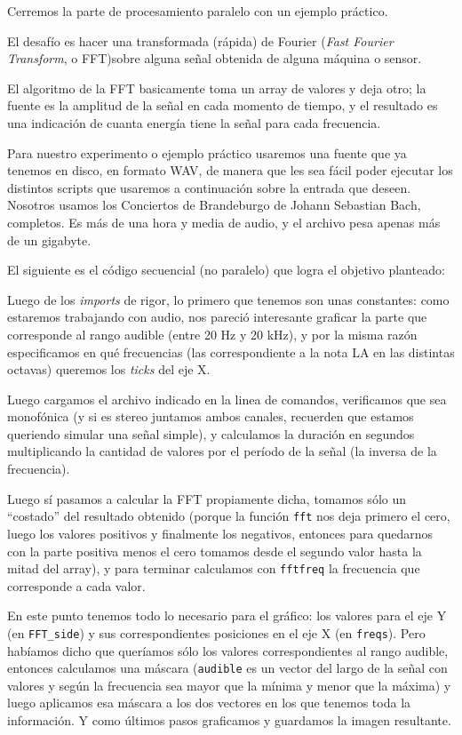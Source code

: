 Cerremos la parte de procesamiento paralelo con un ejemplo práctico.

El desafío es hacer una transformada (rápida) de Fourier (\textit{Fast Fourier Transform}, o FFT)sobre alguna señal obtenida de alguna máquina o sensor.

\begin{info}
El algoritmo de la FFT basicamente toma un array de valores y deja otro; la fuente es la amplitud de la señal en cada momento de tiempo, y el resultado es una indicación de cuanta energía tiene la señal para cada frecuencia.
\end{info}

Para nuestro experimento o ejemplo práctico usaremos una fuente que ya tenemos en disco, en formato WAV, de manera que les sea fácil poder ejecutar los distintos scripts que usaremos a continuación sobre la entrada que deseen. Nosotros usamos los Conciertos de Brandeburgo de Johann Sebastian Bach, completos. Es más de una hora y media de audio, y el archivo pesa apenas más de un gigabyte.

El siguiente es el código secuencial (no paralelo) que logra el objetivo planteado:


Luego de los \textit{imports} de rigor, lo primero que tenemos son unas constantes: como estaremos trabajando con audio, nos pareció interesante graficar la parte que corresponde al rango audible (entre 20 Hz y 20 kHz), y por la misma razón especificamos en qué frecuencias (las correspondiente a la nota LA en las distintas octavas) queremos los \textit{ticks} del eje X.

Luego cargamos el archivo indicado en la linea de comandos, verificamos que sea monofónica (y si es stereo juntamos ambos canales, recuerden que estamos queriendo simular una señal simple), y calculamos la duración en segundos multiplicando la cantidad de valores por el período de la señal (la inversa de la frecuencia).

Luego sí pasamos a calcular la FFT propiamente dicha, tomamos sólo un ``costado'' del resultado obtenido (porque la función \texttt{fft} nos deja primero el cero, luego los valores positivos y finalmente los negativos, entonces para quedarnos con la parte positiva menos el cero tomamos desde el segundo valor hasta la mitad del array), y para terminar calculamos con \texttt{fftfreq} la frecuencia que corresponde a cada valor.

En este punto tenemos todo lo necesario para el gráfico: los valores para el eje Y (en \texttt{FFT\_side}) y sus correspondientes posiciones en el eje X (en \texttt{freqs}). Pero habíamos dicho que queríamos sólo los valores correspondientes al rango audible, entonces calculamos una máscara (\texttt{audible} es un vector del largo de la señal con valores  y  según la frecuencia sea mayor que la mínima y menor que la máxima) y luego aplicamos esa máscara a los dos vectores en los que tenemos toda la información. Y como últimos pasos graficamos y guardamos la imagen resultante.

